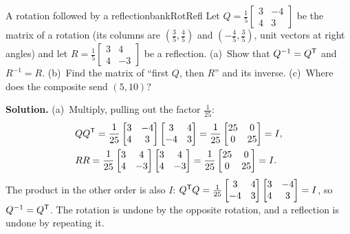 \documentclass[11pt]{article}
\begin{document}
\begin{exmp}{A rotation followed by a reflection}{bankRotRefl}
Let $Q=\frac15\begin{bmatrix}3&-4\\4&3\end{bmatrix}$ be the matrix of a rotation (its columns are $(\tfrac35,\tfrac45)$ and $(-\tfrac45,\tfrac35)$, unit vectors at right angles) and let $R=\frac15\begin{bmatrix}3&4\\4&-3\end{bmatrix}$ be a reflection. (a)~Show that $Q^{-1}=Q^{\mathsf T}$ and $R^{-1}=R$. (b)~Find the matrix of ``first $Q$, then $R$'' and its inverse. (c)~Where does the composite send $(5,10)$?

\textbf{Solution.} (a)~Multiply, pulling out the factor $\frac1{25}$:
\begin{align*}
&QQ^{\mathsf T}=\frac1{25}\begin{bmatrix}3&-4\\4&3\end{bmatrix}\begin{bmatrix}3&4\\-4&3\end{bmatrix}=\frac1{25}\begin{bmatrix}25&0\\0&25\end{bmatrix}=I,\\
&RR=\frac1{25}\begin{bmatrix}3&4\\4&-3\end{bmatrix}\begin{bmatrix}3&4\\4&-3\end{bmatrix}=\frac1{25}\begin{bmatrix}25&0\\0&25\end{bmatrix}=I.
\end{align*}
The product in the other order is also $I$: $Q^{\mathsf T} Q=\frac1{25}\begin{bmatrix}3&4\\-4&3\end{bmatrix}\begin{bmatrix}3&-4\\4&3\end{bmatrix}=I$, so $Q^{-1}=Q^{\mathsf T}$. The rotation is undone by the opposite rotation, and a reflection is undone by repeating it.


\end{exmp}
\end{document}
